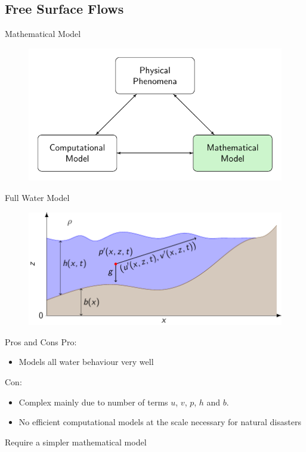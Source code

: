 \documentclass[pdf]{beamer}
\begin{document}
\subsection{Free Surface Flows}
\begin{frame}{Mathematical Model}
	\begin{figure}
		\includegraphics[width=\textwidth]{./Pics/ModelDiagrams/FlowChartHigh2G.pdf}
	\end{figure}
\end{frame}
\begin{frame}{Full Water Model}
	\begin{figure}
		\includegraphics[width=\textwidth]{./Pics/WaterModelDiagrams/NavierStokes.pdf}
	\end{figure}
\end{frame}
\begin{frame}{Pros and Cons}
	Pro:
	\begin{itemize}
		\item Models all water behaviour very well 
	\end{itemize}
	Con:
	\begin{itemize}
		\item Complex mainly due to number of terms $u$, $v$, $p$, $h$ and $b$. 
		\item No efficient computational models at the scale necessary for natural disasters
	\end{itemize}
	Require a simpler mathematical model
\end{frame}
\end{document}
